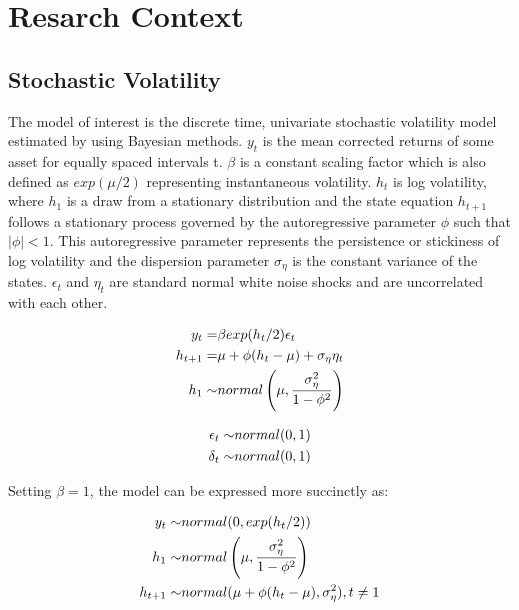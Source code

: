 \documentclass[12pt, a4paper]{article}
\begin{document}
\section{Resarch Context}

\subsection{Stochastic Volatility}
    The model of interest is the discrete time, univariate stochastic volatility model estimated by \citet{kim1998stochastic} using Bayesian methods. $y_t$ is the mean corrected returns of some asset for equally spaced intervals t. $\beta$ is a constant scaling factor which is also defined as $exp(\mu / 2)$ representing instantaneous volatility. $h_t$ is log volatility, where $h_1$ is a draw from a stationary distribution and the state equation $h_{t+1}$ follows a stationary process governed by the autoregressive parameter $\phi$ such that $|\phi|<1$. This autoregressive parameter represents the persistence or stickiness of log volatility and the dispersion parameter $\sigma_{\eta}$ is the constant variance of the states. $\epsilon_t$ and $\eta_t$ are standard normal white noise shocks and are uncorrelated with each other. 

    $$
    \begin{aligned}
    y_t =& \space \beta exp(h_t/2) \epsilon_t \\
    h_{t+1} =& \space \mu +\phi(h_t - \mu) + \sigma_{\eta} \eta_t  \\
    h_1 \sim& \space normal\left(\mu, \frac{\sigma_{\eta}^2}{1-\phi^2}\right) \\
    \end{aligned}
    $$


    $$
    \begin{aligned}
    \epsilon_t \sim& \space normal(0,1) \\
    \delta_t \sim& \space normal(0,1)
    \end{aligned}
    $$

    Setting $\beta=1$, the model can be expressed more succinctly as:

    $$
    \begin{aligned}
    y_t \sim& \space normal(0, exp(h_t/2)) \\ 
    h_1 \sim& \space normal \left(\mu, \frac{\sigma_{\eta}^2}{1-\phi^2}\right) \\
    h_{t+1} \sim& \space normal(\mu +\phi(h_t - \mu) , \sigma_{\eta}^2), \space\space t\neq 1\\ 
    \end{aligned}
    $$
\end{document}
